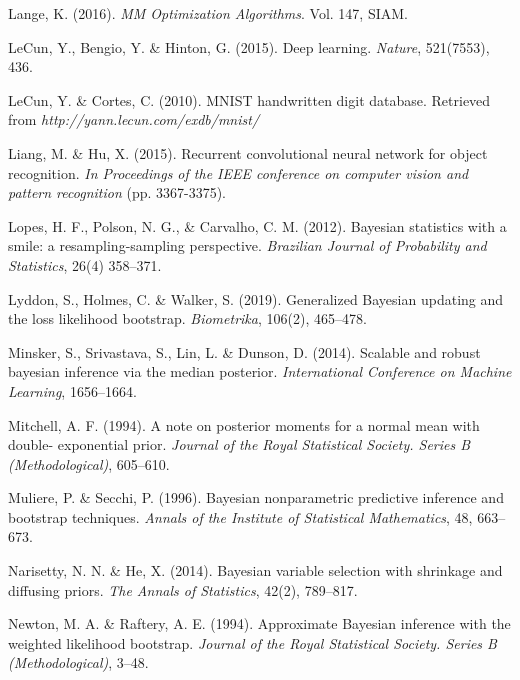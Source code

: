 \documentclass[12pt]{TD-CJS}
\begin{document}
\begin{thebibliography}{}
Lange, K. (2016). {\em MM Optimization Algorithms}. Vol. 147, SIAM. 

LeCun, Y., Bengio, Y. \& Hinton, G. (2015). Deep learning. {\it Nature}, 521(7553), 436.

LeCun, Y. \& Cortes, C. (2010). MNIST handwritten digit database. Retrieved from {\it http://yann.lecun.com/exdb/mnist/}

Liang, M. \& Hu, X. (2015). Recurrent convolutional neural network for object recognition. {\it In Proceedings of the IEEE conference on computer vision and pattern recognition} (pp. 3367-3375).

Lopes, H. F., Polson, N. G., \& Carvalho, C. M. (2012). Bayesian statistics with a smile: a resampling-sampling perspective. {\it Brazilian Journal of Probability and Statistics}, 26(4) 358--371.

Lyddon, S., Holmes, C. \& Walker, S. (2019). 
Generalized Bayesian updating and the loss likelihood bootstrap. {\em Biometrika}, 106(2), 465--478.


Minsker, S., Srivastava, S.,  Lin, L. \& Dunson, D. (2014). Scalable and robust bayesian inference via the median posterior. {\it International Conference on Machine Learning}, 1656--1664.

Mitchell, A. F. (1994). A note on posterior moments for a normal mean with double- exponential prior. {\it Journal of the Royal Statistical Society. Series B (Methodological)}, 605--610.

Muliere, P. \& Secchi, P. (1996). Bayesian nonparametric predictive inference and bootstrap techniques.
 {\em Annals of the Institute of Statistical Mathematics}, 48, 663--673.


Narisetty, N. N. \& He, X. (2014). Bayesian variable selection with shrinkage and
diffusing priors. {\it The Annals of Statistics}, 42(2), 789--817.


Newton, M. A. \& Raftery, A. E.  (1994). Approximate Bayesian inference with the weighted likelihood bootstrap. {\it Journal of the Royal Statistical Society. Series B (Methodological)}, 3--48.


\end{thebibliography}
\end{document}
